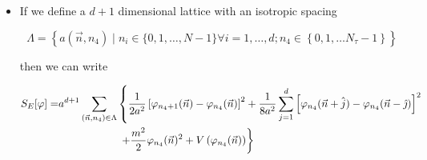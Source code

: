 \begin{itemize}
Thus

\begin{equation}
\begin{aligned}
 X=&\lim _{O\ll N_{t}\ll N_{\tau}} C^{N_\tau} \int \mathcal{D} \varphi_{0} \ldots \mathcal{D} \varphi_{N_{\tau-1}} \theta_{2}\left(\varphi_{N_{t}}\right) \theta_{1}\left(\varphi_{0}\right) \times \\
& \qquad \qquad\times \exp \left[-\frac{\varepsilon}{2}\left\{U\left(\varphi_{0}\right)+U\left(\varphi_{N_{\tau} - 1}\right)\right\}-\frac{a^{d}}{2 \varepsilon} \sum_{\vec{n}\in\Lambda_d} \left(\varphi_{0}(\vec{n})-\varphi_{N_{\tau}-1}(\vec{n})\right)^{2}\right] \\
& \qquad \qquad \times \cdots \times \exp \left[-\frac{\varepsilon}{2}\left\{U\left(\varphi_{1}\right)+U\left(\varphi_{0}\right)\right\}-\frac{a^{d}}{2 \varepsilon} \sum_{\vec{n} \in \Lambda_{d}}\left(\varphi_{1}(\vec{n})-\varphi_{0}(\vec{n})\right)^{2}\right] \\
=&\lim _{0\ll N_{t} \ll N_{\tau}} C^{N_{\tau}} \int \mathcal{D} \varphi_{0} \ldots \mathcal{D} \varphi_{N_{\tau}-1} \theta_{2}\left(\varphi_{N_{t}}\right) \theta_{1}\left(\varphi_{0}\right) \exp \left(-S_{E}[\varphi]\right)
\end{aligned}
\end{equation}

with

\begin{equation}
S_{\varepsilon}[\varphi]=\frac{a^{d}}{2 \varepsilon} \sum_{s=0}^{N_{\tau}-1} \sum_{\vec{n} \in \Lambda_d}\left[\varphi_{s+1}(\vec{n})-\varphi_{s}(\vec{n})\right]^{2}+\varepsilon \sum_{s=0}^{N_{\tau}-1} U\left(\varphi_{s}\right)
\end{equation}

where we assume \(\varphi_{N_{\tau}}=\varphi_{0}\) (periodic in time)

  \item If we define a \(d+1\) dimensional lattice with an isotropic spacing

\begin{equation}
\Lambda=\left\{a\left(\vec{n}, n_{4}\right) \mid n_{i} \in\{0,1, \ldots, N-1\} \forall i=1, \ldots, d ; n_{4} \in\left\{0,1, \ldots N_{\tau}-1\right\}\right\}
\end{equation}

then we can write

\begin{equation}
\begin{aligned}
 S_{E}[\varphi]=&a^{d+1} \sum_{\left(\vec{n}, n_{4}\right) \in \Lambda}\left\{\frac{1}{2a^2}\left[\varphi_{n_{4}+1}(\vec{n})-\varphi_{n_{4}}(\vec{n})\right]^{2}+\frac{1}{8 a^{2}} \sum_{j=1}^{d}\left[\varphi_{n_{4}}(\vec{n}+\hat{j})-\varphi_{n_{4}}(\vec{n}-\hat{\jmath})\right]^{2}\right. \\
&\hspace*{2cm}\left.+\frac{m^{2}}{2} \varphi_{n_{4}}(\vec{n})^{2}+V\left(\varphi_{n_{4}}(\vec{n})\right)\right\}
\end{aligned}
\end{equation}


\end{itemize}
